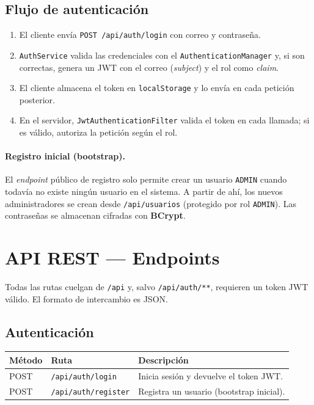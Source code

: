 \documentclass[11pt,a4paper]{article}
\begin{document}
\subsection{Flujo de autenticación}

\begin{enumerate}[noitemsep]
    \item El cliente envía \texttt{POST /api/auth/login} con correo y contraseña.
    \item \texttt{AuthService} valida las credenciales con el
          \texttt{AuthenticationManager} y, si son correctas, genera un JWT
          con el correo (\emph{subject}) y el rol como \emph{claim}.
    \item El cliente almacena el token en \texttt{localStorage} y lo envía en
          cada petición posterior.
    \item En el servidor, \texttt{JwtAuthenticationFilter} valida el token en
          cada llamada; si es válido, autoriza la petición según el rol.
\end{enumerate}

\paragraph{Registro inicial (bootstrap).} El \emph{endpoint} público de
registro solo permite crear un usuario \texttt{ADMIN} cuando todavía no existe
ningún usuario en el sistema. A partir de ahí, los nuevos administradores se
crean desde \texttt{/api/usuarios} (protegido por rol \texttt{ADMIN}). Las
contraseñas se almacenan cifradas con \textbf{BCrypt}.

\section{API REST --- Endpoints}

Todas las rutas cuelgan de \texttt{/api} y, salvo \texttt{/api/auth/**},
requieren un token JWT válido. El formato de intercambio es JSON.

\subsection{Autenticación}
\begin{longtable}{p{2cm} p{4.5cm} p{7.5cm}}
\toprule
\textbf{Método} & \textbf{Ruta} & \textbf{Descripción} \\
\midrule
\endhead
POST & \texttt{/api/auth/login} & Inicia sesión y devuelve el token JWT. \\
POST & \texttt{/api/auth/register} & Registra un usuario (bootstrap inicial). \\
\bottomrule
\end{longtable}
\end{document}
